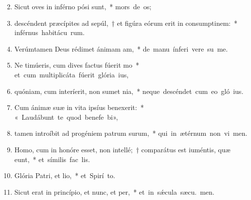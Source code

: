 \begin{flushleft}
\begin{enumerate}[leftmargin=*]
\setcounter{enumi}{1}

\item Sicut oves in inférno pósi sunt,~* \mbox{mors de os;}

\item descéndent præcípites ad sepúl,~† et figúra eórum erit in consumptinem:~* \mbox{inférnus habitácu rum.}

\item Verúmtamen Deus rédimet ánimam am,~* \mbox{de manu ínferi vere su me.}

\item Ne timúeris, cum dives factus fúerit mo~* \mbox{et cum multiplicáta fúerit glória  ius,}

\item quóniam, cum interíerit, non sumet nia,~* \mbox{neque descéndet cum eo gló ius.}

\item Cum ánimæ suæ in vita ipsíus benexerit:~* \mbox{« Laudábunt te quod benefe bi»,}

\item tamen introíbit ad progéniem patrum surum,~* \mbox{qui in ætérnum non vi men.}

\item Homo, cum in honóre esset, non intellé;~† comparátus est iuméntis, quæ eunt,~* \mbox{et símilis fac  lis.}

\item Glória Patri, et lio,~* \mbox{et Spirí to.}

\item Sicut erat in princípio, et nunc, et per,~* \mbox{et in s\'{\ae}cula sæcu. men.}

\end{enumerate}
\end{flushleft}

